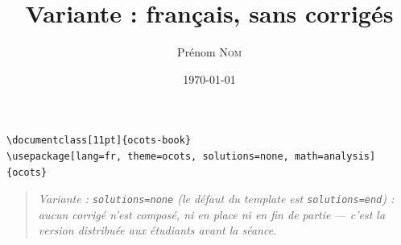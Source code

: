 \documentclass[11pt]{ocots-book}
\title{Variante : français, sans corrigés}
\author{Prénom \textsc{Nom}}
\date{\today}
\newcommand{\ocotsvariantnote}[1]{\begin{quote}\itshape Variante : #1\end{quote}}
\begin{document}
\begin{lstlisting}
\documentclass[11pt]{ocots-book}
\usepackage[lang=fr, theme=ocots, solutions=none, math=analysis]{ocots}
\end{lstlisting}
\ocotsvariantnote{\texttt{solutions=none} (le défaut du template est
\texttt{solutions=end}) : aucun corrigé n'est composé, ni en place ni en fin
de partie — c'est la version distribuée aux étudiants avant la séance.}

\ocotscollectsolutions

\ocotsprintsolutions
\end{document}
